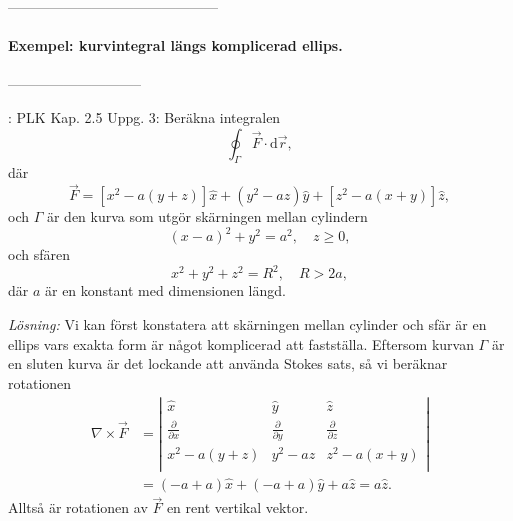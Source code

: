 \documentclass[%
oneside,                 %
final,                   %
10pt]{article}
\newcommand{\shortinlinecomment}[3]{{\color{red}{\bf #1}: #2}}
\begin{document}
---------------------------------------------

\paragraph{Exempel: kurvintegral längs komplicerad ellips.}
-----------------------------

\shortinlinecomment{Comment 2}{ PLK Kap. 2.5 Uppg. 3: }{ PLK Kap. 2.5 Uppg. }  Beräkna integralen
\begin{equation}
  \oint_\Gamma \vec{F} \cdot \mbox{d}\vec{r},
\end{equation}
där 
\begin{equation}
  \vec{F} = \left[x^2-a\left(y+z\right)\right]\hat{x} + \left(y^2-az\right)
\hat{y} + \left[z^2-a\left(x+y\right)\right] \hat{z},
\end{equation}
och $\Gamma$ är den kurva som utgör skärningen mellan cylindern
\begin{equation}
 \left(x-a\right)^2 +y^2 = a^2,\quad z \ge 0,
\end{equation}
och sfären
\begin{equation}
  x^2 + y^2 + z^2 = R^2, \quad R> 2a,
\end{equation}
där $a$ är en konstant med dimensionen längd.

\emph{Lösning:}  Vi kan först konstatera att skärningen mellan cylinder och sfär är en ellips vars exakta form är något komplicerad att fastställa.  Eftersom kurvan $\Gamma$ är en sluten kurva är det lockande att använda Stokes sats, så vi beräknar rotationen
\begin{align}
  \nabla \times \vec{F} &= \left|\begin{array}{ccc}
\hat{x} & \hat{y} & \hat{z} \\
\frac{\partial}{\partial x} & \frac{\partial}{\partial y} & 
\frac{\partial}{\partial z} \\
x^2-a\left(y+z\right) & y^2-az & z^2-a\left(x+y\right) \\
\end{array}\right| \nonumber \\
&= \left(-a+a\right) \hat{x} + \left(-a+a\right) \hat{y} + a\hat{z}
= a\hat{z}.
\end{align}
Alltså är rotationen av $\vec{F}$ en rent vertikal vektor.  
\end{document}
